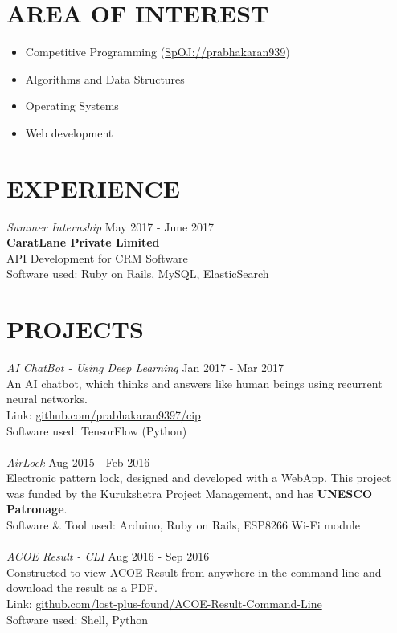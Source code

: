 \documentclass[margin, 10pt]{res} %
\begin{document}
\begin{resume}
\section{AREA OF INTEREST}
\begin{itemize}
\item Competitive Programming (\href{https://spoj.com/users/prabhakaran939}{SpOJ://prabhakaran939})
\item Algorithms and Data Structures
\item Operating Systems
\item Web development
\end{itemize}
\section{EXPERIENCE}
{\sl Summer Internship } \hfill May 2017 - June 2017 \\
{\bf CaratLane Private Limited} \\
API Development for CRM Software \\
Software used: Ruby on Rails, MySQL, ElasticSearch
\section{PROJECTS}
{\sl AI ChatBot - Using Deep Learning} \hfill Jan 2017 - Mar 2017 \\
An AI chatbot, which thinks and answers like human beings using recurrent neural networks. \\
Link: \href{https://github.com/prabhakaran9397/cip}{github.com/prabhakaran9397/cip} \\
Software used: TensorFlow (Python) \\
\\
{\sl AirLock} \hfill Aug 2015 - Feb 2016 \\
Electronic pattern lock, designed and developed with a WebApp. This project was funded by the Kurukshetra Project Management, and has \textbf{UNESCO Patronage}.\\
Software \& Tool used: Arduino, Ruby on Rails, ESP8266 Wi-Fi module \\
\\
{\sl ACOE Result - CLI} \hfill Aug 2016 - Sep 2016 \\
Constructed to view ACOE Result from anywhere in the command line and download the result as a PDF. \\
Link: \href{https://github.com/lost-plus-found/ACOE-Result-Command-Line}{github.com/lost-plus-found/ACOE-Result-Command-Line} \\
Software used: Shell, Python

\end{resume}
\end{document}
